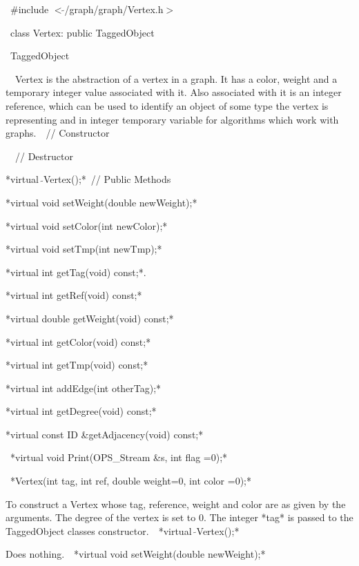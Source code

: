 \
#include $<\tilde{ }$/graph/graph/Vertex.h$>$

\
class Vertex: public TaggedObject

\
TaggedObject

\
\
Vertex is the abstraction of a vertex in a graph. It has a color, weight
and a temporary integer value associated with it. Also associated with
it is an integer reference, which can be used to identify an object of
some type the vertex is representing and in integer temporary variable
for algorithms which work with graphs.\
\
// Constructor

\
\
// Destructor

*virtual $\tilde{}$Vertex();*\
// Public Methods

*virtual void setWeight(double newWeight);*

*virtual void setColor(int newColor);*

*virtual void setTmp(int newTmp);*

*virtual int getTag(void) const;*.

*virtual int getRef(void) const;*

*virtual double getWeight(void) const;*

*virtual int getColor(void) const;*

*virtual int getTmp(void) const;*

*virtual int addEdge(int otherTag);*

*virtual int getDegree(void) const;*

*virtual const ID &getAdjacency(void) const;*

\
*virtual void Print(OPS_Stream &s, int flag =0);*

\
*Vertex(int tag, int ref, double weight=0, int color =0);*

To construct a Vertex whose tag, reference, weight and color are as
given by the arguments. The degree of the vertex is set to $0$. The
integer *tag* is passed to the TaggedObject classes constructor.\
\
*virtual $\tilde{}$Vertex();*

Does nothing.\
\
*virtual void setWeight(double newWeight);*

